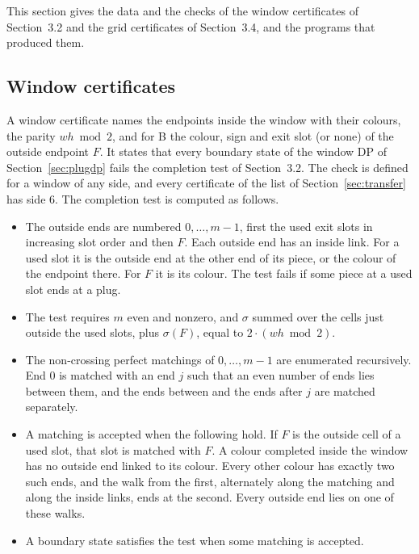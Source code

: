 \documentclass[11pt]{article}
\begin{document}
This section gives the data and the checks of the window certificates of Section~3.2 and the grid
certificates of Section~3.4, and the programs that produced them.

\subsection{Window certificates}

A window certificate names the endpoints inside the window with their colours, the parity
$wh\bmod 2$, and for B the colour, sign and exit slot (or none) of the outside endpoint $F$. It
states that every boundary state of the window DP of Section~\ref{sec:plugdp} fails the completion
test of Section~3.2. The check is defined for a window of any side, and every certificate of the
list of Section~\ref{sec:transfer} has side $6$. The completion test is computed as follows.

\begin{itemize}
\item The outside ends are numbered $0,\ldots,m-1$, first the used exit slots in increasing slot
  order and then $F$. Each outside end has an inside link. For a used slot it is the outside end
  at the other end of its piece, or the colour of the endpoint there. For $F$ it is its colour.
  The test fails if some piece at a used slot ends at a plug.
\item The test requires $m$ even and nonzero, and $\sigma$ summed over the cells just outside the
  used slots, plus $\sigma(F)$, equal to $2\cdot(wh\bmod 2)$.
\item The non-crossing perfect matchings of $0,\ldots,m-1$ are enumerated recursively. End $0$ is
  matched with an end $j$ such that an even number of ends lies between them, and the ends between
  and the ends after $j$ are matched separately.
\item A matching is accepted when the following hold. If $F$ is the outside cell of a used slot,
  that slot is matched with $F$. A colour completed inside the window has no outside end linked to
  its colour. Every other colour has exactly two such ends, and the walk from the first, alternately
  along the matching and along the inside links, ends at the second. Every outside end lies on one
  of these walks.
\item A boundary state satisfies the test when some matching is accepted.
\end{itemize}
\end{document}
